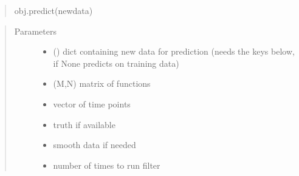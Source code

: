 \documentclass[letterpaper,10pt,english]{sphinxmanual}
\begin{document}
\begin{fulllineitems}
\begin{fulllineitems}
\begin{quote}
obj.predict(newdata)
\end{quote}
\begin{quote}\begin{description}
\item[{Parameters}] \leavevmode\begin{itemize}
\item {} 
 () \textendash{} dict containing new data for prediction (needs the keys below, if None predicts on training data)

\item {} 
 \textendash{} (M,N) matrix of functions

\item {} 
 \textendash{} vector of time points

\item {} 
 \textendash{} truth if available

\item {} 
 \textendash{} smooth data if needed

\item {} 
 \textendash{} number of times to run filter

\end{itemize}

\end{description}\end{quote}

\end{fulllineitems}


\end{fulllineitems}

\end{document}
